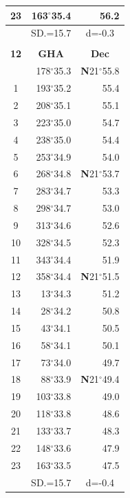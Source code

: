 \documentclass[10pt, a4paper]{report}
\begin{document}
\begin{scriptsize}
\begin{tabular*}{0.2\textwidth}[t]{@{\extracolsep{\fill}}|c|rr|}
23 & 163$^\circ$35.4 & 56.2\\
\hline
\rule{0pt}{2.4ex} & \multicolumn{1}{c}{SD.=15.7} & \multicolumn{1}{c|}{d=-0.3}\\
\hline
\multicolumn{1}{c}{}\\[-0.5ex]\hline
\multicolumn{1}{|c|}{\rule{0pt}{2.6ex}\textbf{12}} & \multicolumn{1}{c}{\textbf{GHA}} & \multicolumn{1}{c|}{\textbf{Dec}}\\
\hline\rule{0pt}{2.6ex}\noindent
0 & 178$^\circ$35.3 & \textbf{N}21$^\circ$55.8\\
1 & 193$^\circ$35.2 & 55.4\\
2 & 208$^\circ$35.1 & 55.1\\
3 & 223$^\circ$35.0 & \raisebox{0.24ex}{\boldmath$\cdot$~\boldmath$\cdot$~~}54.7\\
4 & 238$^\circ$35.0 & 54.4\\
5 & 253$^\circ$34.9 & 54.0\\[2Pt]
6 & 268$^\circ$34.8 & \textbf{N}21$^\circ$53.7\\
7 & 283$^\circ$34.7 & 53.3\\
8 & 298$^\circ$34.7 & 53.0\\
9 & 313$^\circ$34.6 & \raisebox{0.24ex}{\boldmath$\cdot$~\boldmath$\cdot$~~}52.6\\
10 & 328$^\circ$34.5 & 52.3\\
11 & 343$^\circ$34.4 & 51.9\\[2Pt]
12 & 358$^\circ$34.4 & \textbf{N}21$^\circ$51.5\\
13 & 13$^\circ$34.3 & 51.2\\
14 & 28$^\circ$34.2 & 50.8\\
15 & 43$^\circ$34.1 & \raisebox{0.24ex}{\boldmath$\cdot$~\boldmath$\cdot$~~}50.5\\
16 & 58$^\circ$34.1 & 50.1\\
17 & 73$^\circ$34.0 & 49.7\\[2Pt]
18 & 88$^\circ$33.9 & \textbf{N}21$^\circ$49.4\\
19 & 103$^\circ$33.8 & 49.0\\
20 & 118$^\circ$33.8 & 48.6\\
21 & 133$^\circ$33.7 & \raisebox{0.24ex}{\boldmath$\cdot$~\boldmath$\cdot$~~}48.3\\
22 & 148$^\circ$33.6 & 47.9\\
23 & 163$^\circ$33.5 & 47.5\\
\hline
\rule{0pt}{2.4ex} & \multicolumn{1}{c}{SD.=15.7} & \multicolumn{1}{c|}{d=-0.4}\\
\hline
\end{tabular*}\noindent

\end{scriptsize}
\end{document}
